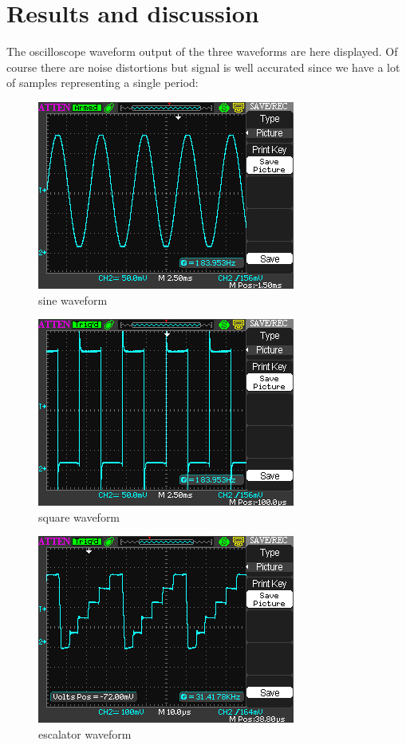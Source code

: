 \documentclass[peerreview]{IEEEtran}
\begin{document}
\section{Results and discussion}
The oscilloscope waveform output of the three waveforms are here displayed. Of course there are noise distortions but signal is well accurated since we have a lot of samples representing a single period:
\begin{figure}[!ht]
\centering
\includegraphics[width=0.8\columnwidth]{sine} 
\caption{sine waveform}
\label{fig_sine}
\end{figure}
\begin{figure}[!ht]
\centering
\includegraphics[width=0.8\columnwidth]{square} 
\caption{square waveform}
\label{fig_square}
\end{figure}
\begin{figure}[!ht]
\centering
\includegraphics[width=0.8\columnwidth]{escalator} 
\caption{escalator waveform}
\label{fig_escalator}
\end{figure}
\end{document}
